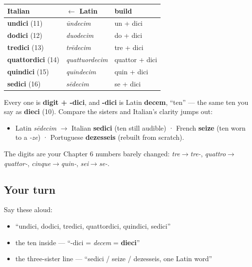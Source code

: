 \begin{grammarlens}[title={Grammar Lens: six fusions}]
\noindent
\begin{tabularx}{\linewidth}{@{}>{\raggedright\arraybackslash}X>{\raggedright\arraybackslash}X>{\raggedright\arraybackslash}X@{}}
\toprule
\textbf{Italian} & \textbf{$\leftarrow$ Latin} & \textbf{build} \\
\midrule
\textbf{undici} (11) & \emph{ūndecim} & un + dici \\
\textbf{dodici} (12) & \emph{duodecim} & do + dici \\
\textbf{tredici} (13) & \emph{trēdecim} & tre + dici \\
\textbf{quattordici} (14) & \emph{quattuordecim} & quattor + dici \\
\textbf{quindici} (15) & \emph{quīndecim} & quin + dici \\
\textbf{sedici} (16) & \emph{sēdecim} & se + dici \\
\bottomrule
\end{tabularx}

Every one is \textbf{digit + -dici}, and \textbf{-dici} is Latin \textbf{decem}, \textquotedblleft{}ten\textquotedblright{} — the same ten you say as \textbf{dieci} (10). Compare the sisters and Italian's clarity jumps out:

\begin{itemize}
\raggedright
  \item Latin \emph{sēdecim} $\to$ Italian \textbf{sedici} (ten still audible) · French \textbf{seize} (ten worn to a \emph{-ze}) · Portuguese \textbf{dezesseis} (rebuilt from scratch).
\end{itemize}

The digits are your Chapter 6 numbers barely changed: \emph{tre$\to$tre-}, \emph{quattro$\to$ quattor-}, \emph{cinque$\to$quin-}, \emph{sei$\to$se-}.
\end{grammarlens}

\subsection*{Your turn}
Say these aloud:

\begin{itemize}
\raggedright
  \item \textquotedblleft{}undici, dodici, tredici, quattordici, quindici, sedici\textquotedblright{}
  \item the ten inside — \textquotedblleft{}-dici = \emph{decem} = \textbf{dieci}\textquotedblright{}
  \item the three-sister line — \textquotedblleft{}sedici / seize / dezesseis, one Latin word\textquotedblright{}
\end{itemize}

